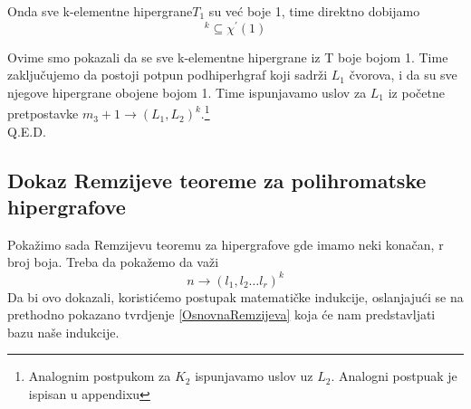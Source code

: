 \documentclass[a4paper]{article}
\begin{document}
\begin{description}
\begin{enumerate}
				Onda sve k-elementne hipergrane$T_1$ su već boje 1, time direktno dobijamo
				\begin{equation}
					[ T ]^k \subseteq \chi^\prime (1)
				\end{equation}
		\end{enumerate}
		Ovime smo pokazali da se sve k-elementne hipergrane iz T boje bojom 1. Time zaključujemo da postoji potpun podhiperhgraf koji sadrži $L_1$ čvorova, i da su sve njegove hipergrane obojene bojom 1. Time ispunjavamo uslov za $L_1$ iz početne pretpostavke $m_3 + 1 \rightarrow (L_1, L_2)^k$.\footnote{Analognim postpukom za $K_2$ ispunjavamo uslov uz $L_2$. Analogni postpuak je ispisan u appendixu}\\
		{\large Q.E.D.}
	\end{description}
	\subsection{Dokaz Remzijeve teoreme za polihromatske hipergrafove}
	Pokažimo sada Remzijevu teoremu za hipergrafove gde imamo neki konačan, r broj boja. Treba da pokažemo da važi 
	\begin{equation}
		n \rightarrow (l_1, l_2 \dots l_r)^k
	\end{equation}
	Da bi ovo dokazali, koristićemo postupak matematičke indukcije, oslanjajući se na prethodno pokazano tvrdjenje \ref{OsnovnaRemzijeva} koja će nam predstavljati bazu naše indukcije.
\end{document}
